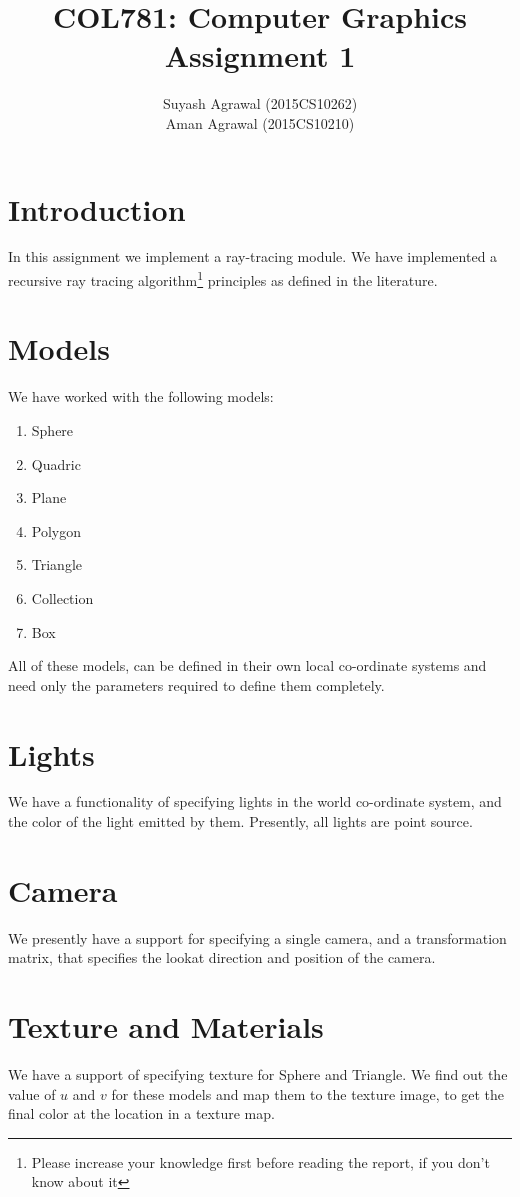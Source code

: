 \documentclass[12pt,a4paper]{article}
\title{COL781: Computer Graphics\\Assignment 1}
\author{Suyash Agrawal (2015CS10262)\\Aman Agrawal (2015CS10210)}
\begin{document}
\maketitle
\section{Introduction}
    In this assignment we implement a ray-tracing module. We have implemented a recursive ray tracing algorithm\footnote{Please increase your knowledge first before reading the report, if you don't know about it} principles as defined in the literature.
    
\section{Models}
    We have worked with the following models:
    \begin{enumerate}
        \item Sphere
        \item Quadric
        \item Plane
        \item Polygon
        \item Triangle
        \item Collection
        \item Box        
    \end{enumerate}

    All of these models, can be defined in their own local co-ordinate systems and need only the parameters required to define them completely.

\section{Lights}
    We have a functionality of specifying lights in the world co-ordinate system, and the color of the light emitted by them. Presently, all lights are point source.

\section{Camera}
    We presently have a support for specifying a single camera, and a transformation matrix, that specifies the lookat direction and position of the camera.

\section{Texture and Materials}
    We have a support of specifying texture for Sphere and Triangle. We find out the value of $u$ and $v$ for these models and map them to the texture image, to get the final color at the location in a texture map.
\end{document}
